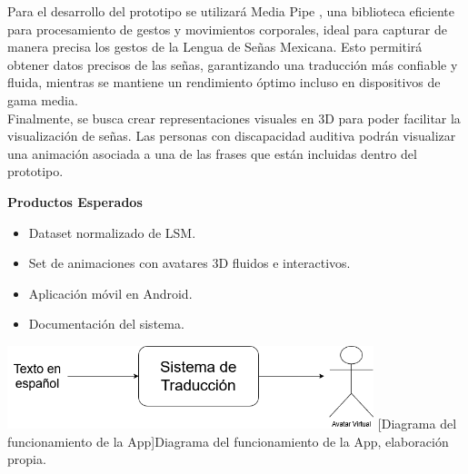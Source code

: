 Para el desarrollo del prototipo se utilizará Media Pipe \cite{ref7}, una biblioteca eficiente para procesamiento de gestos y movimientos corporales, ideal para capturar de manera precisa los gestos de la Lengua de Señas Mexicana. Esto permitirá obtener datos precisos de las señas, garantizando una traducción más confiable y fluida, mientras se mantiene un rendimiento óptimo incluso en dispositivos de gama media.\\

Finalmente, se busca crear representaciones visuales en 3D para poder facilitar la visualización de señas. Las personas con discapacidad auditiva podrán visualizar una animación asociada a una de las frases que están incluidas dentro del prototipo.

\textbf{Productos Esperados}
\begin{itemize}
    \item Dataset normalizado de LSM.
    \item Set de animaciones con avatares 3D fluidos e interactivos.
    \item Aplicación móvil en Android.
    \item Documentación del sistema.\\
\end{itemize}

\begin{center}
    \includegraphics[width=0.8\textwidth]{Images/Cap 1/diacajanegra.png}
    [Diagrama del funcionamiento de la App]{Diagrama del funcionamiento de la App, elaboración propia.}
\end{center}

\newpage
